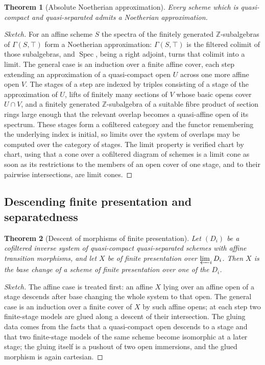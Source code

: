 \documentclass[11pt,a4paper]{article}
\theoremstyle{plain}
\newtheorem{theorem}{Theorem}[section]
\theoremstyle{definition}
\theoremstyle{remark}
\newcommand{\Spec}{\operatorname{Spec}}
\newcommand{\qcqs}{quasi-compact quasi-separated}
\begin{document}
\begin{theorem}[Absolute Noetherian approximation]
\label{thm:01ZA}
Every scheme which is quasi-compact and quasi-separated admits a Noetherian
approximation.
\end{theorem}

\begin{proof}[Sketch]
For an affine scheme $S$ the spectra of the finitely generated
$\mathbb{Z}$-subalgebras of $\Gamma(S,\top)$ form a Noetherian approximation:
$\Gamma(S,\top)$ is the filtered colimit of those subalgebras, and $\Spec$,
being a right adjoint, turns that colimit into a limit. The general case is an
induction over a finite affine cover, each step extending an approximation of a
quasi-compact open $U$ across one more affine open $V$. The stages of a step are
indexed by triples consisting of a stage of the approximation of $U$, lifts of
finitely many sections of $V$ whose basic opens cover $U\cap V$, and a finitely
generated $\mathbb{Z}$-subalgebra of a suitable fibre product of section rings
large enough that the relevant overlap becomes a quasi-affine open of its
spectrum. These stages form a cofiltered category and the functor remembering
the underlying index is initial, so limits over the system of overlaps may be
computed over the category of stages. The limit property is verified chart by
chart, using that a cone over a cofiltered diagram of schemes is a limit cone as
soon as its restrictions to the members of an open cover of one stage, and to
their pairwise intersections, are limit cones.
\end{proof}

\subsection{Descending finite presentation and separatedness}

\begin{theorem}[Descent of morphisms of finite presentation]
\label{thm:01ZM}
Let $(D_i)$ be a cofiltered inverse system of \qcqs{} schemes with affine
transition morphisms, and let $X$ be of finite presentation over
$\varprojlim_i D_i$. Then $X$ is the base change of a scheme of finite
presentation over one of the $D_i$.
\end{theorem}

\begin{proof}[Sketch]
The affine case is treated first: an affine $X$ lying over an affine open of a
stage descends after base changing the whole system to that open. The general
case is an induction over a finite cover of $X$ by such affine opens; at each
step two finite-stage models are glued along a descent of their intersection.
The gluing data comes from the facts that a quasi-compact open descends to a
stage and that two finite-stage models of the same scheme become isomorphic at a
later stage; the gluing itself is a pushout of two open immersions, and the
glued morphism is again cartesian.
\end{proof}
\end{document}

